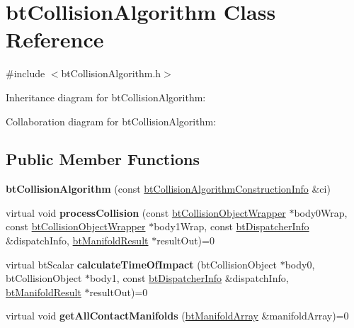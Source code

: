 \hypertarget{classbt_collision_algorithm}{\section{bt\+Collision\+Algorithm Class Reference}
\label{classbt_collision_algorithm}
}


{\ttfamily \#include $<$bt\+Collision\+Algorithm.\+h$>$}



Inheritance diagram for bt\+Collision\+Algorithm\+:


Collaboration diagram for bt\+Collision\+Algorithm\+:
\subsection*{Public Member Functions}
\begin{DoxyCompactItemize}
\item 
\hypertarget{classbt_collision_algorithm_a59457c3cbe46ac8884a1c5fe554776b0}{{\bfseries bt\+Collision\+Algorithm} (const \hyperlink{structbt_collision_algorithm_construction_info}{bt\+Collision\+Algorithm\+Construction\+Info} \&ci)}\label{classbt_collision_algorithm_a59457c3cbe46ac8884a1c5fe554776b0}

\item 
\hypertarget{classbt_collision_algorithm_a239122d128c81d97705204ee4defa613}{virtual void {\bfseries process\+Collision} (const \hyperlink{structbt_collision_object_wrapper}{bt\+Collision\+Object\+Wrapper} $\ast$body0\+Wrap, const \hyperlink{structbt_collision_object_wrapper}{bt\+Collision\+Object\+Wrapper} $\ast$body1\+Wrap, const \hyperlink{structbt_dispatcher_info}{bt\+Dispatcher\+Info} \&dispatch\+Info, \hyperlink{classbt_manifold_result}{bt\+Manifold\+Result} $\ast$result\+Out)=0}\label{classbt_collision_algorithm_a239122d128c81d97705204ee4defa613}

\item 
\hypertarget{classbt_collision_algorithm_aea5afdcbb1266af69a44f05e9866edad}{virtual bt\+Scalar {\bfseries calculate\+Time\+Of\+Impact} (bt\+Collision\+Object $\ast$body0, bt\+Collision\+Object $\ast$body1, const \hyperlink{structbt_dispatcher_info}{bt\+Dispatcher\+Info} \&dispatch\+Info, \hyperlink{classbt_manifold_result}{bt\+Manifold\+Result} $\ast$result\+Out)=0}\label{classbt_collision_algorithm_aea5afdcbb1266af69a44f05e9866edad}

\item 
\hypertarget{classbt_collision_algorithm_a224203965d0115e088db5f8aa8bd11a5}{virtual void {\bfseries get\+All\+Contact\+Manifolds} (\hyperlink{classbt_aligned_object_array}{bt\+Manifold\+Array} \&manifold\+Array)=0}\label{classbt_collision_algorithm_a224203965d0115e088db5f8aa8bd11a5}

\end{DoxyCompactItemize}
